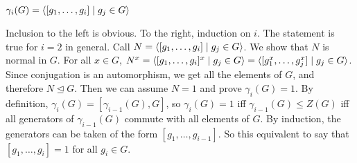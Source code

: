 \documentclass[twoside, 11pt]{article}
\begin{document}
\begin{teorema}
$\gamma_i(G)=\langle{[g_1,\dots, g_i]\mid g_j\in G}\rangle$
\end{teorema}
\begin{dem}
Inclusion to the left is obvious. To the right, induction on $i$. The statement is true for $i=2$ in general. Call $N=\langle{[g_1,\dots, g_i]\mid g_j\in G}\rangle$. We show that $N$ is normal in $G$. For all $x\in G$, $N^x=\langle{[g_1,\dots, g_i]^x\mid g_j\in G}\rangle=\langle{[g_1^x,\dots, g_j^x]\mid g_j\in G}\rangle$. Since conjugation is an automorphism, we get all the elements of $G$, and therefore $N\trianglelefteq G$. Then we can assume $N=1$ and prove $\gamma_i(G)=1$. By definition, $\gamma_i(G)=[\gamma_{i-1}(G),G]$, so $\gamma_i(G)=1$ iff $\gamma_{i-1}(G)\leq Z(G)$ iff all generators of $\gamma_{i-1}(G)$ commute with all elements of $G$. By induction, the generators can be taken of the form $[g_1,\dots, g_{i-1}]$. So this equivalent to say that $[g_1,\dots, g_i]=1$ for all $g_i\in G$. 
\end{dem}
\end{document}
